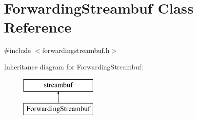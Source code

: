 \hypertarget{classsgl_1_1ForwardingStreambuf}{}\section{Forwarding\+Streambuf Class Reference}
\label{classsgl_1_1ForwardingStreambuf}


{\ttfamily \#include $<$forwardingstreambuf.\+h$>$}

Inheritance diagram for Forwarding\+Streambuf\+:\begin{figure}[H]
\begin{center}
\leavevmode
\includegraphics[height=2.000000cm]{classsgl_1_1ForwardingStreambuf}
\end{center}
\end{figure}
